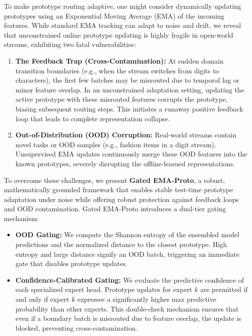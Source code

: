 \documentclass{article}
\theoremstyle{plain}
\theoremstyle{definition}
\theoremstyle{remark}
\begin{document}
To make prototype routing adaptive, one might consider dynamically updating prototypes using an Exponential Moving Average (EMA) of the incoming features. While standard EMA tracking can adapt to noise and drift, we reveal that unconstrained online prototype updating is highly fragile in open-world streams, exhibiting two fatal vulnerabilities:
\begin{enumerate}
    \item \textbf{The Feedback Trap (Cross-Contamination):} At sudden domain transition boundaries (e.g., when the stream switches from digits to characters), the first few batches may be misrouted due to temporal lag or minor feature overlap. In an unconstrained adaptation setting, updating the active prototype with these misrouted features corrupts the prototype, biasing subsequent routing steps. This initiates a runaway positive feedback loop that leads to complete representation collapse.
    \item \textbf{Out-of-Distribution (OOD) Corruption:} Real-world streams contain novel tasks or OOD samples (e.g., fashion items in a digit stream). Unsupervised EMA updates continuously merge these OOD features into the known prototypes, severely disrupting the offline-learned representations.
\end{enumerate}

To overcome these challenges, we present \textbf{Gated EMA-Proto}, a robust, mathematically grounded framework that enables stable test-time prototype adaptation under noise while offering robust protection against feedback loops and OOD contamination. Gated EMA-Proto introduces a dual-tier gating mechanism:
\begin{itemize}
    \item \textbf{OOD Gating:} We compute the Shannon entropy of the ensembled model predictions and the normalized distance to the closest prototype. High entropy and large distance signify an OOD batch, triggering an immediate gate that disables prototype updates.
    \item \textbf{Confidence-Calibrated Gating:} We evaluate the predictive confidence of each specialized expert head. Prototype updates for expert $k$ are permitted if and only if expert $k$ expresses a significantly higher max predictive probability than other experts. This double-check mechanism ensures that even if a boundary batch is misrouted due to feature overlap, the update is blocked, preventing cross-contamination.
\end{itemize}
\end{document}
